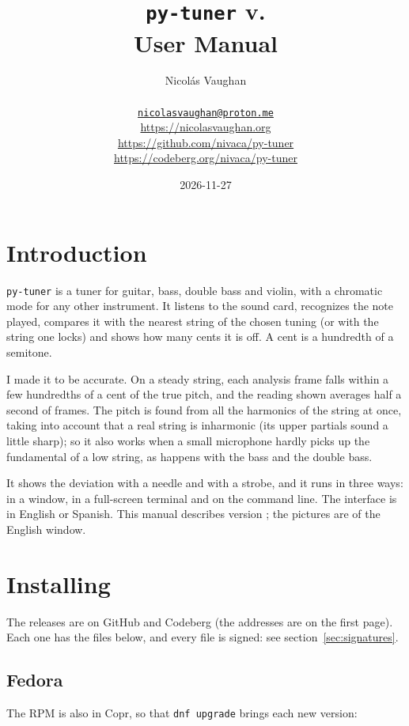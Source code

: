 \documentclass[12pt,
              article,
              oneside
              ]{memoir}
\title{\bfseries%
  \texttt{py-tuner} v.\version{} \\
  User Manual}
\author{%
  Nicolás Vaughan\\
  \begin{minipage}[t]{0.8\linewidth}
    \centering\small%
    \href{mailto:nicolasvaughan@proton.me}{\texttt{nicolasvaughan@proton.me}}\\
    \url{https://nicolasvaughan.org}\\
    \url{https://github.com/nivaca/py-tuner}\\
    \url{https://codeberg.org/nivaca/py-tuner}\\
  \end{minipage}}
\date{2026-11-27}
\begin{document}
\maketitle

\tableofcontents*

\section{Introduction}
\noindent
\texttt{py-tuner} is a tuner for guitar, bass, double bass and violin, with
a chromatic mode for any other instrument. It listens to the sound card,
recognizes the note played, compares it with the nearest string of the
chosen tuning (or with the string one locks) and shows how many cents it
is off. A cent is a hundredth of a semitone.

%
I made it to be accurate. On a steady string, each analysis frame falls
within a few hundredths of a cent of the true pitch, and the reading shown
averages half a second of frames. The pitch is found from all the
harmonics of the string at once, taking into account that a real string is
inharmonic (its upper partials sound a little sharp); so it also works when
a small microphone hardly picks up the fundamental of a low string, as
happens with the bass and the double bass.

%
It shows the deviation with a needle and with a strobe, and it runs in
three ways: in a window, in a full-screen terminal and on the command line.
The interface is in English or Spanish. This manual describes version
\version{}; the pictures are of the English window.

\section{Installing}
\label{sec:installing}

%
The releases are on GitHub and Codeberg (the addresses are on the first
page). Each one has the files below, and every file is signed: see
section~\ref{sec:signatures}.

\subsection{Fedora}

%
The RPM is also in Copr, so that \texttt{dnf upgrade} brings each new
version:
\end{document}
